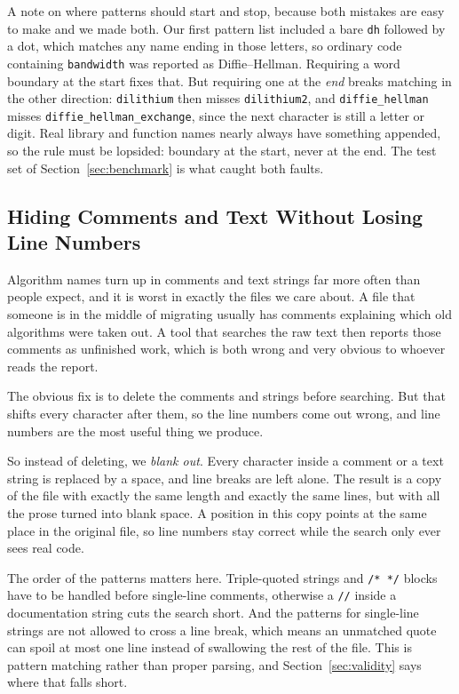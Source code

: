\documentclass[runningheads]{llncs}
\begin{document}
A note on where patterns should start and stop, because both mistakes are easy
to make and we made both. Our first pattern list included a bare \texttt{dh}
followed by a dot, which matches any name ending in those letters, so ordinary
code containing \texttt{bandwidth} was reported as Diffie--Hellman. Requiring a
word boundary at the start fixes that. But requiring one at the \emph{end}
breaks matching in the other direction: \texttt{dilithium} then misses
\texttt{dilithium2}, and \texttt{diffie\_hellman} misses
\texttt{diffie\_hellman\_exchange}, since the next character is still a letter
or digit. Real library and function names nearly always have something
appended, so the rule must be lopsided: boundary at the start, never at the end.
The test set of Section~\ref{sec:benchmark} is what caught both faults.

\subsection{Hiding Comments and Text Without Losing Line Numbers}
\label{sec:masking}

Algorithm names turn up in comments and text strings far more often than people
expect, and it is worst in exactly the files we care about. A file that someone
is in the middle of migrating usually has comments explaining which old
algorithms were taken out. A tool that searches the raw text then reports those
comments as unfinished work, which is both wrong and very obvious to whoever
reads the report.

The obvious fix is to delete the comments and strings before searching. But that
shifts every character after them, so the line numbers come out wrong, and line
numbers are the most useful thing we produce.

So instead of deleting, we \emph{blank out}. Every character inside a comment or
a text string is replaced by a space, and line breaks are left alone. The result
is a copy of the file with exactly the same length and exactly the same lines,
but with all the prose turned into blank space. A position in this copy points
at the same place in the original file, so line numbers stay correct while the
search only ever sees real code.

The order of the patterns matters here. Triple-quoted strings and
\texttt{/* */} blocks have to be handled before single-line comments, otherwise
a \texttt{//} inside a documentation string cuts the search short. And the
patterns for single-line strings are not allowed to cross a line break, which
means an unmatched quote can spoil at most one line instead of swallowing the
rest of the file. This is pattern matching rather than proper parsing, and
Section~\ref{sec:validity} says where that falls short.
\end{document}
